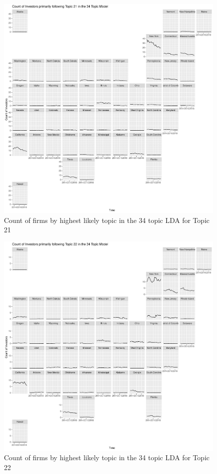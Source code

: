 \begin{figure}
	\centering
	\includegraphics[width=1\linewidth]{Figures/ChapterV/USA_34_Topic21.pdf}
	\caption[Count of firm for Topic 21 by quarter]{Count of firms by highest likely topic in the 34 topic LDA for Topic 21}
	\label{fig:StateLDA21}
\end{figure}

\begin{figure}
	\centering
	\includegraphics[width=1\linewidth]{Figures/ChapterV/USA_34_Topic22.pdf}
	\caption[Count of firm for Topic 22 by quarter]{Count of firms by highest likely topic in the 34 topic LDA for Topic 22}
	\label{fig:StateLDA22}
\end{figure}

